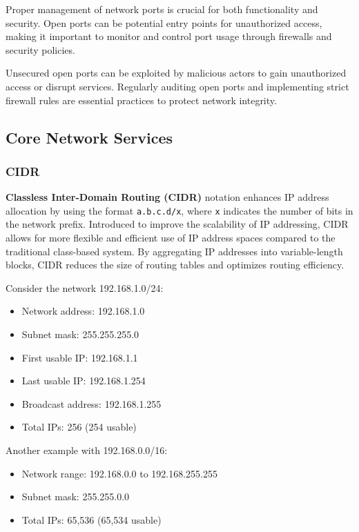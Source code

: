 Proper management of network ports is crucial for both functionality and security. Open ports can be potential entry points for unauthorized access, making it important to monitor and control port usage through firewalls and security policies.

\begin{warningblock}
    Unsecured open ports can be exploited by malicious actors to gain unauthorized access or disrupt services. Regularly auditing open ports and implementing strict firewall rules are essential practices to protect network integrity.
\end{warningblock}

\subsection{Core Network Services}
\label{core_network_services}

\subsubsection{CIDR}
\label{cidr}

\textbf{Classless Inter-Domain Routing (CIDR)} notation enhances IP address allocation by using the format \texttt{a.b.c.d/x}, where \texttt{x} indicates the number of bits in the network prefix. Introduced to improve the scalability of IP addressing, CIDR allows for more flexible and efficient use of IP address spaces compared to the traditional class-based system. By aggregating IP addresses into variable-length blocks, CIDR reduces the size of routing tables and optimizes routing efficiency.

\begin{exampleblock}
    Consider the network 192.168.1.0/24:
    \begin{itemize}
        \item Network address: 192.168.1.0
        \item Subnet mask: 255.255.255.0
        \item First usable IP: 192.168.1.1
        \item Last usable IP: 192.168.1.254
        \item Broadcast address: 192.168.1.255
        \item Total IPs: 256 (254 usable)
    \end{itemize}
    \vspace{1em}
    Another example with 192.168.0.0/16:
    \begin{itemize}
        \item Network range: 192.168.0.0 to 192.168.255.255
        \item Subnet mask: 255.255.0.0
        \item Total IPs: 65,536 (65,534 usable)
    \end{itemize}
\end{exampleblock}

